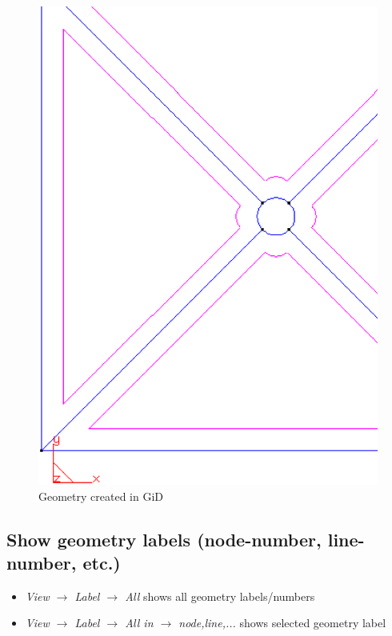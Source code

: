 \begin{figure}[h]
\begin{center}
 \includegraphics[scale=0.25]{pics/tut_fluid_geometry}
 \caption{Geometry created in GiD}
\label{fig:tut_fluid_geometry}
\end{center}
\end{figure}

\subsection{Show geometry labels (node-number, line-number, etc.)}
\label{tut_struct:sec:show-geo-label}

\begin{itemize}
\item \emph{View $\rightarrow$ Label $\rightarrow$ All} shows all geometry
labels/numbers 
\item \emph{View $\rightarrow$ Label $\rightarrow$ All in $\rightarrow$
node,line,...} shows selected geometry label 
\end{itemize}

